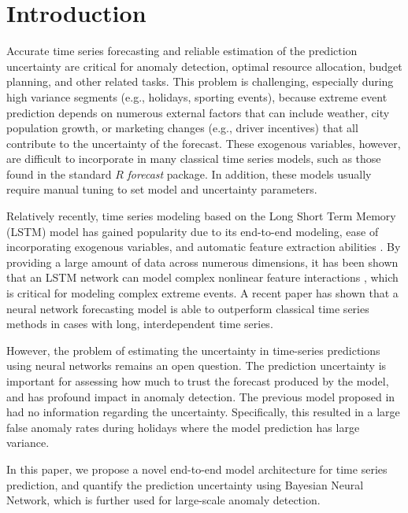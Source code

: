 \documentclass[conference,compsoc,final]{IEEEtran}
\begin{document}
\IEEEpeerreviewmaketitle




\section{Introduction}

Accurate  time series forecasting and reliable estimation of the prediction uncertainty are critical for anomaly detection, optimal resource allocation, budget planning, and other related tasks. This problem is challenging, especially during high variance segments (e.g., holidays, sporting events), because extreme event prediction depends on numerous external factors that can include weather, city population growth, or marketing changes (e.g., driver incentives) \cite{doi:10.1177/1012690204043462} that all contribute to the uncertainty of the forecast.
These exogenous variables, however, are difficult to incorporate in many classical time series models, such as those found in the standard $R$ \textit{forecast}\cite{forecast} package. In addition, these models usually require manual tuning to set model and uncertainty parameters. 

Relatively recently, time series modeling based on the Long Short Term Memory (LSTM) model \cite{Hochreiter:1997:LSM:1246443.1246450} has gained popularity due to its end-to-end modeling, ease of incorporating exogenous variables, and automatic feature extraction abilities \cite{Assaad:2008:NBA:1297420.1297576}. By providing a large amount of data across numerous dimensions, it has been shown that an LSTM network can model complex nonlinear feature interactions \cite{DBLP:journals/corr/OgunmoluGJG16}, which is critical for modeling complex extreme events. A recent paper \cite{laptev:2017:1273496} has shown that a neural network forecasting model is able to outperform classical time series methods in cases with long, interdependent time series. 

However, the problem of estimating the uncertainty in time-series predictions using neural networks remains an open question. The prediction uncertainty is important for assessing how much to trust the forecast produced by the model, and has profound impact in anomaly detection.
The previous model proposed in \cite{laptev:2017:1273496} had no information regarding the uncertainty. Specifically, this resulted in a large false anomaly rates during holidays where the model prediction has large variance. 


In this paper, we propose a novel end-to-end model architecture for time series prediction, and quantify the prediction uncertainty using Bayesian Neural Network, which is further used for large-scale anomaly detection.
\end{document}
